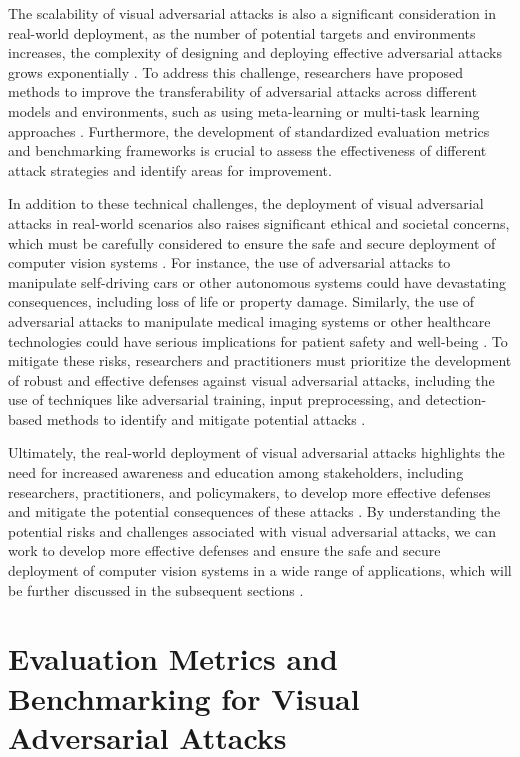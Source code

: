 \documentclass[11pt]{article}
\begin{document}
The scalability of visual adversarial attacks is also a significant consideration in real-world deployment, as the number of potential targets and environments increases, the complexity of designing and deploying effective adversarial attacks grows exponentially \cite{ref141}. To address this challenge, researchers have proposed methods to improve the transferability of adversarial attacks across different models and environments, such as using meta-learning or multi-task learning approaches \cite{ref157}. Furthermore, the development of standardized evaluation metrics and benchmarking frameworks is crucial to assess the effectiveness of different attack strategies and identify areas for improvement.

In addition to these technical challenges, the deployment of visual adversarial attacks in real-world scenarios also raises significant ethical and societal concerns, which must be carefully considered to ensure the safe and secure deployment of computer vision systems \cite{ref17}. For instance, the use of adversarial attacks to manipulate self-driving cars or other autonomous systems could have devastating consequences, including loss of life or property damage. Similarly, the use of adversarial attacks to manipulate medical imaging systems or other healthcare technologies could have serious implications for patient safety and well-being \cite{ref158}. To mitigate these risks, researchers and practitioners must prioritize the development of robust and effective defenses against visual adversarial attacks, including the use of techniques like adversarial training, input preprocessing, and detection-based methods to identify and mitigate potential attacks \cite{ref159}.

Ultimately, the real-world deployment of visual adversarial attacks highlights the need for increased awareness and education among stakeholders, including researchers, practitioners, and policymakers, to develop more effective defenses and mitigate the potential consequences of these attacks \cite{ref15}. By understanding the potential risks and challenges associated with visual adversarial attacks, we can work to develop more effective defenses and ensure the safe and secure deployment of computer vision systems in a wide range of applications, which will be further discussed in the subsequent sections \cite{ref160}.

\section{Evaluation Metrics and Benchmarking for Visual Adversarial Attacks}
\end{document}
